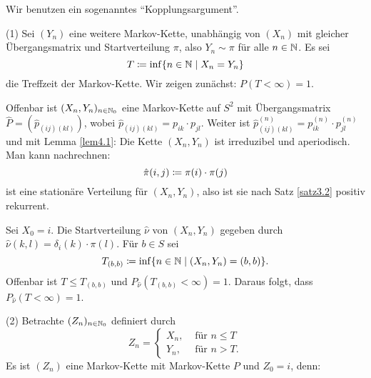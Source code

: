 \documentclass[a4paper,twoside,DIV15,BCOR12mm]{scrbook}
\begin{document}
\begin{beweis}
Wir benutzen ein sogenanntes ``Kopplungsargument''.

(1) Sei $(Y_n)$ eine weitere Markov-Kette, unabhängig von $(X_n)$ mit gleicher Übergangsmatrix und Startverteilung $\pi$, also $Y_n\sim \pi$ für alle $n\in \mathbb{N}$. Es sei
\[
T\da \inf\{n\in \MdN \mid X_n = Y_n\}
\]
die Treffzeit der Markov-Kette. Wir zeigen zunächst: $P(T<\infty) = 1$.

Offenbar ist $(X_n,Y_n)_{n\in\mathbb{N}_0}$ eine Markov-Kette auf $S^2$ mit Übergangsmatrix $\hat P=(\hat p_{(ij)(kl)})$, wobei $\hat p_{(ij)(kl)} = p_{ik}\cdot p_{jl}$. Weiter ist $\hat p_{(ij)(kl)}^{(n)} = p_{ik}^{(n)} \cdot p_{jl}^{(n)}$ und mit Lemma \ref{lem4.1}: Die Kette $(X_n,Y_n)$ ist irreduzibel und aperiodisch. Man kann nachrechnen:
\[
\hat \pi (i,j) \da \pi(i)\cdot\pi(j)
\]
ist eine stationäre Verteilung für $(X_n,Y_n)$, also ist sie nach Satz \ref{satz3.2} positiv rekurrent.

Sei $X_0=i$. Die Startverteilung $\hat \nu$ von $(X_n,Y_n)$ gegeben durch $\hat \nu (k,l) = \delta_i(k) \cdot\pi(l)$. Für $b\in S$ sei 
\[
T_{(b,b)} \da \inf\{n\in\MdN \mid (X_n,Y_n) = (b,b) \}.
\]
Offenbar ist $T\le T_{(b,b)}$ und $P_{\hat \nu}(T_{(b,b)}<\infty)=1$. Daraus folgt, dass $P_{\hat \nu}(T<\infty)=1$.


(2) Betrachte $(Z_n)_{n\in\mathbb{N}_0}$ definiert durch
\[
Z_n= 
\begin{cases}
X_n, &\text{ für } n\le T \\
Y_n, &\text{ für } n>T.
\end{cases}
\]
Es ist $(Z_n)$ eine Markov-Kette mit Markov-Kette $P$ und $Z_0=i$, denn:


\end{beweis}
\end{document}
